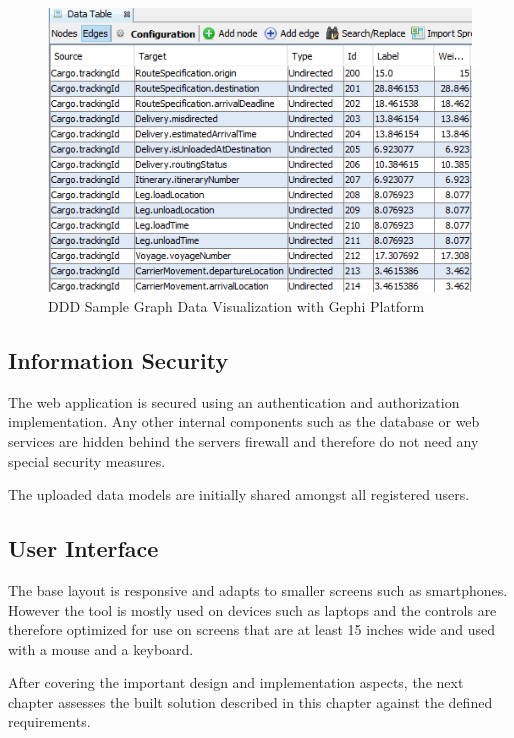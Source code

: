 \begin{figure}[H]
	\includegraphics[scale=0.8]{images/ddd_semantic_proximity_debug_data.png}
	\caption{DDD Sample Graph Data Visualization with Gephi Platform}
	\label{fig:dddSampleData}
\end{figure}


\subsection{Information Security}

The web application is secured using an authentication and authorization implementation. Any other internal components such as the database or web services are hidden behind the servers firewall and therefore do not need any special security measures.

The uploaded data models are initially shared amongst all registered users.

\subsection{User Interface}

The base layout is responsive and adapts to smaller screens such as smartphones. However the tool is mostly used on devices such as laptops and the controls are therefore optimized for use on screens that are at least 15 inches wide and used with a mouse and a keyboard.


\bigskip
After covering the important design and implementation aspects, the next chapter assesses the built solution described in this chapter against the defined requirements.
